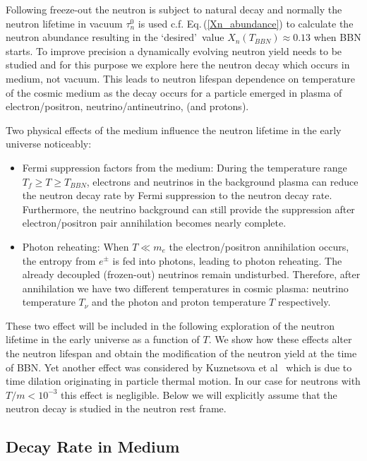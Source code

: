 Following freeze-out the neutron is subject to natural decay and normally the neutron lifetime in vacuum $\tau_n^0$ is used c.f. Eq.\,(\ref{Xn_abundance}) to calculate the neutron abundance resulting in the \lq desired\rq\ value $X_n(T_{BBN})\approx0.13$ when BBN starts. To improve precision a dynamically evolving neutron yield needs to be studied and for this purpose we explore here the neutron decay which occurs in  medium, not vacuum. This leads to  neutron lifespan dependence on temperature of the cosmic medium as the decay occurs for a particle emerged in plasma of electron/positron, neutrino/antineutrino, (and protons).

Two physical effects of the medium  influence the neutron lifetime in the early universe noticeably:
\begin{itemize}
\item Fermi suppression factors from the medium: 
During the temperature range $T_f\geqslant T\geqslant T_{BBN}$, electrons and neutrinos in the background plasma can reduce the neutron decay rate by Fermi suppression to the neutron decay rate. Furthermore, the neutrino background can still provide the suppression after electron/positron pair annihilation becomes nearly complete.
\item Photon reheating:
When $T\ll m_e$ the electron/positron annihilation occurs, the entropy from $e^\pm$ is fed into photons, leading to photon reheating. The already decoupled (frozen-out) neutrinos remain undisturbed. Therefore, after annihilation we have two different temperatures in cosmic plasma: neutrino temperature $T_\nu$ and the photon and proton temperature $T$ respectively.
\end{itemize}
These two effect will be included in the following exploration of the neutron lifetime in the early universe as a function of $T$. We show how these effects alter the neutron lifespan and obtain the modification of the neutron yield at the time of BBN. Yet another effect was considered by Kuznetsova et al~\cite{Kuznetsova:2010pi} which is due to time dilation originating in particle thermal motion. In our case for neutrons with $T/m<10^{-3}$ this effect is negligible. Below we will explicitly assume that the neutron decay is studied in the neutron rest frame.

\subsection{Decay Rate in Medium}\label{Rate_Medium}

